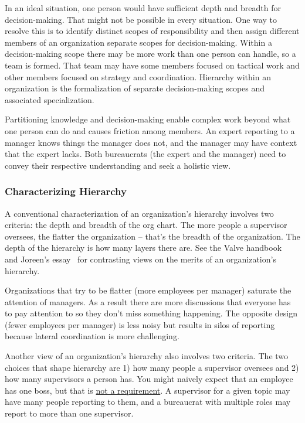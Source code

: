 In an ideal situation, one person would have sufficient depth and breadth for decision-making. That might not be possible in every situation. One way to resolve this is to identify distinct scopes of responsibility and then assign different members of an organization separate scopes for decision-making. Within a decision-making scope there may be more work than one person can handle, so a team is formed. That team may have some members focused on tactical work and other members focused on strategy and coordination. Hierarchy within an organization is the formalization of separate decision-making scopes and associated specialization. 

Partitioning knowledge and decision-making enable complex work beyond what one person can do and causes friction among members. An expert reporting to a manager knows things the manager does not, and the manager may have context that the expert lacks. Both bureaucrats (the expert and the manager) need to convey their respective understanding and seek a holistic view.

\subsubsection*{Characterizing Hierarchy}

A conventional characterization of an organization's hierarchy involves two criteria: the depth and breadth of the \gls{org chart}.
The more people a supervisor oversees, the flatter the organization -- that's the breadth of the organization. The depth of the hierarchy is how many layers there are. See the Valve handbook~\cite{2012_Valve} and Joreen's essay~\cite{1972_Joreen} for contrasting views on the merits of an organization's hierarchy. 

Organizations that try to be flatter (more employees per manager) saturate the attention of managers. As a result there are more discussions that everyone has to pay attention to so they don't miss something happening. The opposite design (fewer employees per manager) is less noisy but results in silos of reporting because lateral coordination is more challenging.

Another view of an organization's hierarchy also involves two criteria. The two choices that shape hierarchy are 
1) how many people a supervisor oversees and 
2) how many supervisors a person has. 
You might naively expect that an employee has one boss, but that is \href{https://en.wikipedia.org/wiki/Matrix_management}{not a requirement}. 
\iftoggle{WPinmargin}{\marginpar{$>$Wikipedia: Matrix management}}{}
A supervisor for a given topic may have many people reporting to them, and a bureaucrat with multiple roles may report to more than one supervisor.

